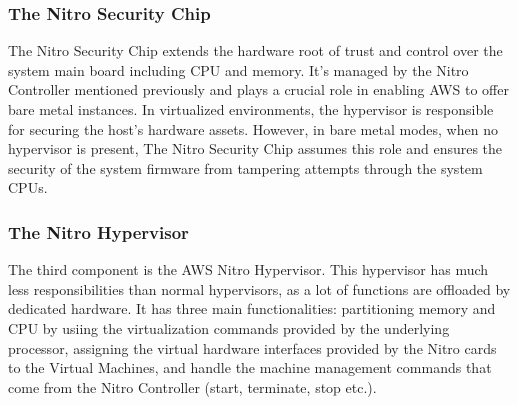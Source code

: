 \subsubsection{The Nitro Security Chip}
The Nitro Security Chip extends the hardware root of trust and control over the system main board including 
CPU and memory. It's managed by the Nitro Controller mentioned previously and plays a crucial role in enabling 
AWS to offer bare metal instances. In virtualized environments, the hypervisor is responsible for securing the 
host's hardware assets. However, in bare metal modes, when no hypervisor is present, The Nitro Security Chip 
assumes this role and ensures the security of the system firmware from tampering attempts through the system 
CPUs.  
\subsubsection{The Nitro Hypervisor}
The third component is the AWS Nitro Hypervisor. This hypervisor has much less responsibilities than normal 
hypervisors, as a lot of functions are offloaded by dedicated hardware. It has three main functionalities: 
partitioning memory and CPU by usiing the virtualization commands provided by the underlying processor, 
assigning the virtual hardware interfaces provided by the Nitro cards to the Virtual Machines, and handle 
the machine management commands that come from the Nitro Controller (start, terminate, stop etc.). 